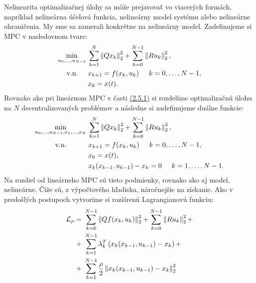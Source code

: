 Nelinearita optimalizačnej úlohy sa môže prejavovať vo viacerých formách, napríklad nelineárna účelová funkcia, nelineárny model systému alebo nelineárne ohraničenia. My sme sa zamerali konkrétne na nelineárny model. 
Zadefinujeme si MPC v nasledovnom tvare:
\begin{subequations}
	\begin{align}
	\displaystyle \min_{u_0,...,u_{N-1}} \hspace{0.1cm} &\sum_{k=1}^{N}\left\lVert Qx_k\right\rVert^{2}_{2}+\sum_{k=0}^{N-1}\left\lVert Ru_k\right\rVert^{2}_{2},\\
	\textrm{v.n.} \hspace{0.5cm} & x_{k+1} = f(x_{k},u_{k})\hspace{0.5cm} k=0,\dots,N-1,\\
	& x_{0} = x(t).
	\end{align}
\end{subequations}
Rovnako ako pri lineárnom MPC v časti \hyperref[math:ADMM_MPC]{(2.5.1)} si rozdelíme optimalizačnú úlohu na $N$ decentralizovaných problémov a následne si zadefinujeme duálne funkcie:
\begin{subequations}
	\begin{align}
	\displaystyle \min_{u_0,...,u_{N-1},x_1,...,x_N}\hspace{0.1cm} & 
	\sum_{k=1}^{N}
	\left\lVert
		Qx_k
	\right\rVert^{2}_{2}
	+
	\sum_{k=0}^{N-1}\left\lVert
		Ru_k
	\right\rVert^{2}_{2},\\
	\textrm{v.n.} \hspace{1.1cm} & x_{k+1} = f(x_{k},u_{k})\hspace{0.5cm} k=0,\dots,N-1,\\
	& x_{0} = x(t),\\
	& x_{k}(x_{k-1},u_{k-1})- x_{k} = 0 \hspace{0.5cm} k=1,\dots,N-1.
	\end{align}
\end{subequations}
Na rozdiel od lineárneho MPC sú tieto podmienky, rovnako ako aj model, nelineárne. Čiže sú, z výpočtového hľadiska, náročnejšie na získanie. Ako v predošlých postupoch vytvorime si rozšírenú Lagrangianovú funkciu:
\begin{equation}
\begin{split}
\mathcal{L}_{\rho} =&~ \sum_{k=0}^{N-1}
\left\lVert
	Qf(x_{k},u_{k})
\right\rVert^{2}_{2}
+
\sum_{k=0}^{N-1}\left\lVert
	Ru_k
\right\rVert^{2}_{2}+\\+&~\sum_{k=1}^{N-1}\lambda_{k}^{T}\left( x_{k}(x_{k-1},u_{k-1}) - x_{k} \right) +\\+&~\sum_{k=1}^{N-1}\frac{\rho}{2} \left\lVert x_{k}(x_{k-1},u_{k-1}) - x_{k}\right\rVert_{2}^{2}
\end{split}
\end{equation}
